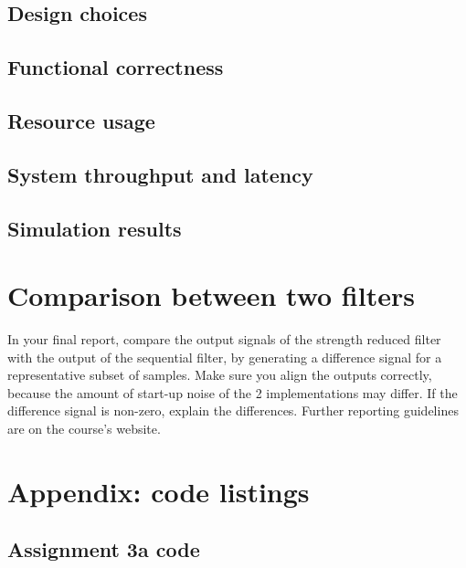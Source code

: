 \documentclass[a4paper,twoside,11pt, fleqn]{article}
\begin{document}
\subsection{Design choices}
\subsection{Functional correctness}
\subsection{Resource usage}
\subsection{System throughput and latency}
\subsection{Simulation results}



\newpage
\section{Comparison between two filters}
In your final report, compare the output signals of the strength reduced filter with the output of the sequential filter, by generating a difference signal for a representative subset of
samples. Make sure you align the outputs correctly, because the amount of start-up noise of
the 2 implementations may differ. If the difference signal is non-zero, explain the differences.
Further reporting guidelines are on the course’s website.

\newpage
\section{Appendix: code listings}

\subsection{Assignment 3a code}
\label{code:3a}

\lstset{ %
	numbers=left
}
\end{document}
